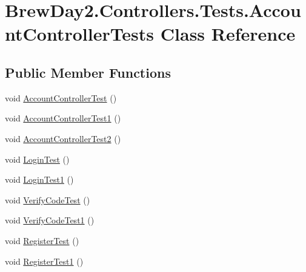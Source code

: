 \hypertarget{class_brew_day2_1_1_controllers_1_1_tests_1_1_account_controller_tests}{}\section{Brew\+Day2.\+Controllers.\+Tests.\+Account\+Controller\+Tests Class Reference}
\label{class_brew_day2_1_1_controllers_1_1_tests_1_1_account_controller_tests}
\subsection*{Public Member Functions}
\begin{DoxyCompactItemize}
\item 
void \mbox{\hyperlink{class_brew_day2_1_1_controllers_1_1_tests_1_1_account_controller_tests_a9edd32be87edcc63d5002c677e0a6f6f}{Account\+Controller\+Test}} ()
\item 
void \mbox{\hyperlink{class_brew_day2_1_1_controllers_1_1_tests_1_1_account_controller_tests_a779ab07cb73c256161d180008aee17b3}{Account\+Controller\+Test1}} ()
\item 
void \mbox{\hyperlink{class_brew_day2_1_1_controllers_1_1_tests_1_1_account_controller_tests_a715628775122b6dce474c932036cd6d6}{Account\+Controller\+Test2}} ()
\item 
void \mbox{\hyperlink{class_brew_day2_1_1_controllers_1_1_tests_1_1_account_controller_tests_a60cf6dd874a135c1da783b5df62c7014}{Login\+Test}} ()
\item 
void \mbox{\hyperlink{class_brew_day2_1_1_controllers_1_1_tests_1_1_account_controller_tests_aa7530b8bcb9770088af94573fb7c4e74}{Login\+Test1}} ()
\item 
void \mbox{\hyperlink{class_brew_day2_1_1_controllers_1_1_tests_1_1_account_controller_tests_a4ca7c37ea1cc1b931ea6a68a1556e043}{Verify\+Code\+Test}} ()
\item 
void \mbox{\hyperlink{class_brew_day2_1_1_controllers_1_1_tests_1_1_account_controller_tests_a0c30aae552752bac16d762a689081c5d}{Verify\+Code\+Test1}} ()
\item 
void \mbox{\hyperlink{class_brew_day2_1_1_controllers_1_1_tests_1_1_account_controller_tests_aa2726597e3694835b804d3567156c276}{Register\+Test}} ()
\item 
void \mbox{\hyperlink{class_brew_day2_1_1_controllers_1_1_tests_1_1_account_controller_tests_a5924eff9b1c057710f16838de63c41d6}{Register\+Test1}} ()

\end{DoxyCompactItemize}
